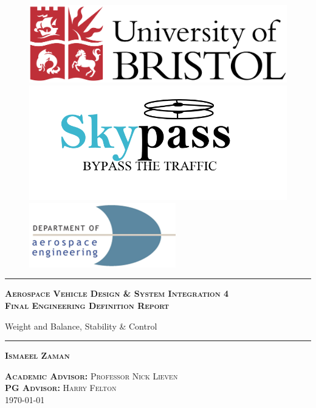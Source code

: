 \documentclass[11pt,a4paper]{article}
\begin{document}
\begin{titlepage}

\begin{figure}[H]
  \includegraphics[width=.75\linewidth]{University_of_Bristol_logo.png}
  \endminipage\hfill
  \centering
    \includegraphics[width=.75\linewidth]{Logo.png}
    \endminipage\hfill
    \hspace{12mm}
      \includegraphics[width=.75\linewidth]{Aero_logo.png}
      \endminipage
      \end{figure}

\center 
\hrule
\textsc{\Large \textbf{Aerospace Vehicle Design \& System Integration 4 \\ \vspace{2mm} Final Engineering Definition Report}}

{ \large  Weight and Balance, Stability \& Control }
\vspace{6pt}
\hrule

\textsc{\textbf{Ismaeel Zaman}} 


\textsc{\textbf{Academic Advisor:} Professor Nick Lieven} \\
\textsc{\textbf{PG Advisor:} Harry Felton}
\\[0.5cm]
\textsc{\large \today} 
\vspace{6pt}


\end{titlepage}
\end{document}

